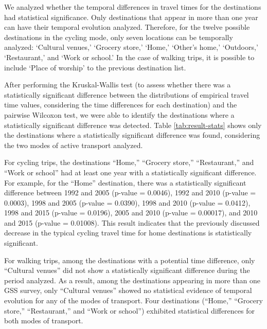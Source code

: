 \documentclass[preprint, 3p,
authoryear]{elsarticle} %
\begin{document}
We analyzed whether the temporal differences in travel times for the
destinations had statistical significance. Only destinations that appear
in more than one year can have their temporal evolution analyzed.
Therefore, for the twelve possible destinations in the cycling mode,
only seven locations can be temporally analyzed: `Cultural venues,'
`Grocery store,' `Home,' `Other's home,' `Outdoors,' `Restaurant,' and
`Work or school.' In the case of walking trips, it is possible to
include `Place of worship' to the previous destination list.

After performing the Kruskal-Wallis test (to assess whether there was a
statistically significant difference between the distributions of
empirical travel time values, considering the time differences for each
destination) and the pairwise Wilcoxon test, we were able to identify
the destinations where a statistically significant difference was
detected. Table \ref{tab:result-stats} shows only the destinations where
a statistically significant difference was found, considering the two
modes of active transport analyzed.

For cycling trips, the destinations ``Home,'' ``Grocery store,''
``Restaurant,'' and ``Work or school'' had at least one year with a
statistically significant difference. For example, for the ``Home''
destination, there was a statistically significant difference between
1992 and 2005 (p-value = 0.0046), 1992 and 2010 (p-value = 0.0003), 1998
and 2005 (p-value = 0.0390), 1998 and 2010 (p-value = 0.0412), 1998 and
2015 (p-value = 0.0196), 2005 and 2010 (p-value = 0.00017), and 2010 and
2015 (p-value = 0.01008). This result indicates that the previously
discussed decrease in the typical cycling travel time for home
destinations is statistically significant.

For walking trips, among the destinations with a potential time
difference, only ``Cultural venues'' did not show a statistically
significant difference during the period analyzed. As a result, among
the destinations appearing in more than one GSS survey, only ``Cultural
venues'' showed no statistical evidence of temporal evolution for any of
the modes of transport. Four destinations (``Home,'' ``Grocery store,''
``Restaurant,'' and ``Work or school'') exhibited statistical
differences for both modes of transport.
\end{document}
